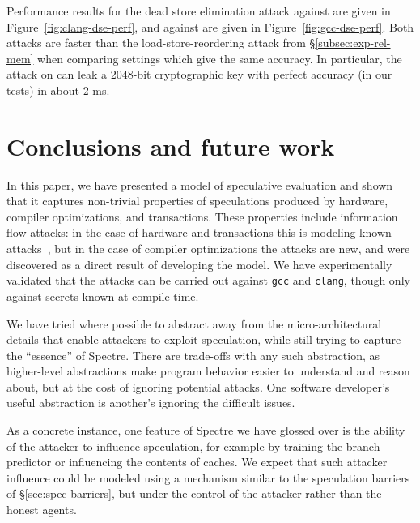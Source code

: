\documentclass[conference]{IEEEtran}
\theoremstyle{plain}
\theoremstyle{definition}
\begin{document}
Performance results for the dead store elimination attack against {\CLANG}
are given in Figure~\ref{fig:clang-dse-perf}, and against {\GCC} are given in
Figure~\ref{fig:gcc-dse-perf}.
Both attacks are faster than the load-store-reordering attack from
\S\ref{subsec:exp-rel-mem} when comparing settings which give the same
accuracy.
In particular, the attack on {\GCC} can leak a 2048-bit cryptographic
key with perfect accuracy (in our tests) in about $2$ ms.

\section{Conclusions and future work}

In this paper, we have presented a model of speculative evaluation and
shown that it captures non-trivial properties of speculations produced
by hardware, compiler optimizations, and transactions. These properties
include information flow attacks: in the case of hardware and transactions
this is modeling known attacks~\cite{DBLP:journals/corr/abs-1801-01203,DBLP:conf/uss/DisselkoenKPT17},
but in the case of compiler optimizations the attacks are new, and were
discovered as a direct result of developing the model. We have experimentally
validated that the attacks can be carried out against \verb|gcc| and \verb|clang|,
though only against secrets known at compile time.

We have tried where possible to abstract away from the
micro-architectural details that enable attackers to exploit
speculation, while still trying to capture the ``essence'' of
Spectre. There are trade-offs with any such abstraction, as
higher-level abstractions make program behavior easier to understand
and reason about, but at the cost of ignoring potential attacks. One
software developer's useful abstraction is another's ignoring the
difficult issues.

As a concrete instance, one feature of Spectre we have glossed over is
the ability of the attacker to influence speculation, for example by
training the branch predictor or influencing the contents of caches.
We expect that such attacker influence could be modeled using a
mechanism similar to the speculation barriers of \S\ref{sec:spec-barriers},
but under the control of the attacker rather than the honest agents.
\end{document}
